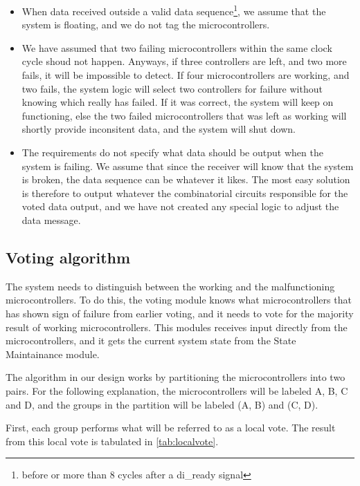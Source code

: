 \begin{itemize}
    \item When data received outside a valid data sequence\footnote{before or more than 8 cycles after a {\ttfamily di\_ready} signal}, we
        assume that the system is floating, and we do not tag the microcontrollers.
    \item We have assumed that two failing microcontrollers within the same clock cycle shoud not happen.
        Anyways, if three controllers are left, and two more fails, it will be impossible to detect. If four microcontrollers are working, and two fails, the
        system logic will select two controllers for failure without knowing which really has failed. If it was correct, the system will keep
        on functioning, else the two failed microcontrollers that was left as working will shortly provide inconsitent data, and the system
        will shut down.
    \item The requirements do not specify what data should be output when the system is failing. We assume that since the receiver will
        know that the system is broken, the data sequence can be whatever it likes. The most easy solution is therefore to output
        whatever the combinatorial circuits responsible for the voted data output, and we have not created any special logic to adjust the
        data message.
\end{itemize}


\subsection{Voting algorithm}
The system needs to distinguish between the working and the
malfunctioning microcontrollers. To do this, the voting module knows
what microcontrollers that has shown sign of failure from earlier
voting, and it needs to vote for the majority result of working
microcontrollers. This modules receives input directly from the
microcontrollers, and it gets the current system state from the State
Maintainance module.

The algorithm in our design works by partitioning the microcontrollers
into two pairs. For the following explanation, the microcontrollers
will be labeled A, B, C and D, and the groups in the partition will be
labeled (A, B) and (C, D).

First, each group performs what will be referred to as a local
vote. The result from this local vote is tabulated in
\autoref{tab:localvote}.

